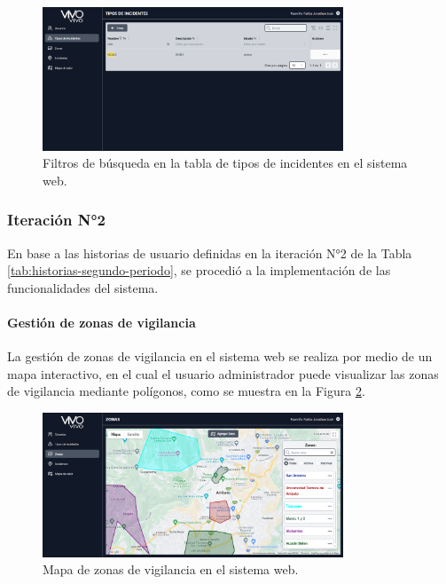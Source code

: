 \begin{figure}[H]
    \centering
    \includegraphics[width=0.8\textwidth]{chapters/III-resultados-y-discusion/resources/images/filtros-tabla-tipos-incidentes-web.png}
    \caption{Filtros de búsqueda en la tabla de tipos de incidentes en el sistema web.}
    \label{fig:filtros-tabla-tipos-incidentes-web}
\end{figure}

\subsubsection{Iteración N°2}

En base a las historias de usuario definidas en la iteración N°2 de la Tabla \ref{tab:historias-segundo-periodo}, se procedió a la implementación
de las funcionalidades del sistema.

\paragraph{Gestión de zonas de vigilancia}

La gestión de zonas de vigilancia en el sistema web se realiza por medio de un mapa interactivo, en el cual el usuario administrador
puede visualizar las zonas de vigilancia mediante polígonos, como se muestra en la Figura \ref{fig:mapa-zonas-vigilancia-web}.

\begin{figure}[H]
    \centering
    \includegraphics[width=0.8\textwidth]{chapters/III-resultados-y-discusion/resources/images/mapa-zonas-vigilancia-web.png}
    \caption{Mapa de zonas de vigilancia en el sistema web.}
    \label{fig:mapa-zonas-vigilancia-web}
\end{figure}

